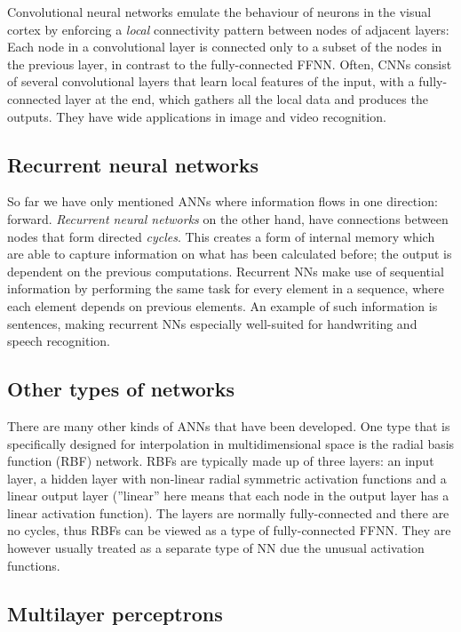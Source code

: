 \documentclass[%
oneside,                 %
final,                   %
10pt]{article}
\begin{document}
Convolutional neural networks emulate the behaviour of neurons in the
visual cortex by enforcing a \emph{local} connectivity pattern between
nodes of adjacent layers: Each node in a convolutional layer is
connected only to a subset of the nodes in the previous layer, in
contrast to the fully-connected FFNN.  Often, CNNs consist of several
convolutional layers that learn local features of the input, with a
fully-connected layer at the end, which gathers all the local data and
produces the outputs. They have wide applications in image and video
recognition.

\subsection{Recurrent neural networks}

So far we have only mentioned ANNs where information flows in one
direction: forward. \emph{Recurrent neural networks} on the other hand,
have connections between nodes that form directed \emph{cycles}. This
creates a form of internal memory which are able to capture
information on what has been calculated before; the output is
dependent on the previous computations. Recurrent NNs make use of
sequential information by performing the same task for every element
in a sequence, where each element depends on previous elements. An
example of such information is sentences, making recurrent NNs
especially well-suited for handwriting and speech recognition.

\subsection{Other types of networks}

There are many other kinds of ANNs that have been developed. One type
that is specifically designed for interpolation in multidimensional
space is the radial basis function (RBF) network. RBFs are typically
made up of three layers: an input layer, a hidden layer with
non-linear radial symmetric activation functions and a linear output
layer (''linear'' here means that each node in the output layer has a
linear activation function). The layers are normally fully-connected
and there are no cycles, thus RBFs can be viewed as a type of
fully-connected FFNN. They are however usually treated as a separate
type of NN due the unusual activation functions.

\subsection{Multilayer perceptrons}
\end{document}
